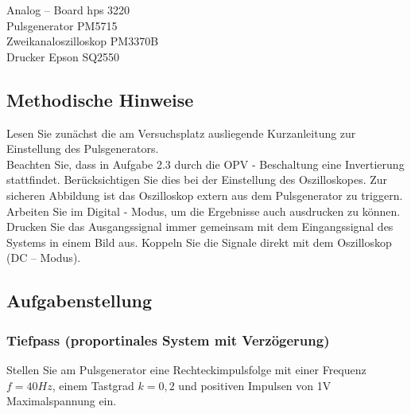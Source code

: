 Analog – Board hps 3220 \\
Pulsgenerator PM5715 \\
Zweikanaloszilloskop PM3370B \\
Drucker Epson SQ2550\\

\subsection{Methodische Hinweise}

Lesen Sie zunächst die am Versuchsplatz ausliegende Kurzanleitung zur Einstellung des Pulsgenerators. \\
Beachten Sie, dass in Aufgabe 2.3 durch die OPV - Beschaltung eine Invertierung stattfindet. Berücksichtigen 
Sie dies bei der Einstellung des Oszilloskopes. Zur sicheren Abbildung ist das Oszilloskop extern aus dem 
Pulsgenerator zu triggern. Arbeiten Sie im Digital - Modus, um die Ergebnisse auch ausdrucken zu können. 
Drucken Sie das Ausgangssignal immer gemeinsam mit dem Eingangssignal des Systems in einem Bild aus. 
Koppeln Sie die Signale direkt mit dem Oszilloskop (DC – Modus).

\subsection{Aufgabenstellung}

\subsubsection{Tiefpass (proportinales System mit Verzögerung)}

Stellen Sie am Pulsgenerator eine Rechteckimpulsfolge mit einer Frequenz $f = 40 Hz$, einem Tastgrad 
$k = 0,2$ und positiven Impulsen von 1V Maximalspannung ein. 

